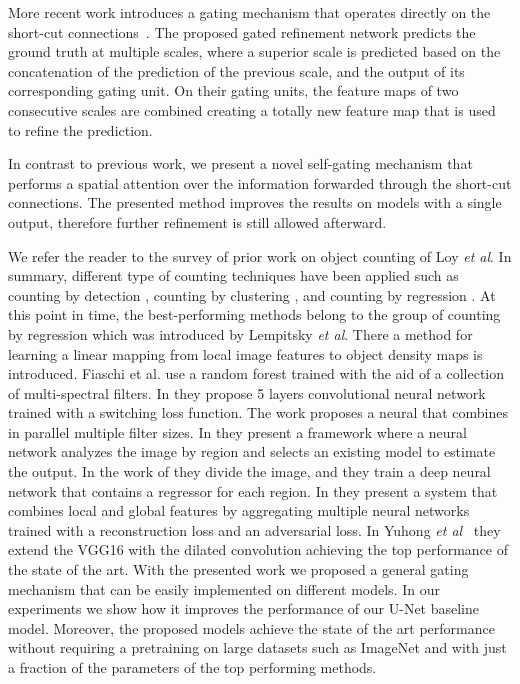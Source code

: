 \documentclass{bmvc2k}
\def\etal{\emph{et al}\bmvaOneDot}
\begin{document}
More recent work introduces a gating mechanism that operates directly on the short-cut connections~\cite{Islam_2017_CVPR}. The proposed gated refinement network predicts the ground truth at multiple scales, where a superior scale is predicted based on the concatenation of the prediction of the previous scale, and the output of its corresponding gating unit. On their gating units, the feature maps of two consecutive scales are combined creating a totally new feature map that is used to refine the prediction. 

In contrast to previous work, we present a novel self-gating mechanism that performs a spatial attention over the information forwarded through the short-cut connections. The presented method improves the results on models with a single output, therefore further refinement is still allowed afterward.


We refer the reader to the survey of prior work on object counting of Loy \etal\cite{loy2013}. In summary, different type of counting techniques have been applied such as counting by detection \cite{dalal2005,felzenszwalb2010,chen2015,leibe2005,li2008,patzold2010,viola2004,wang2011}, counting by clustering \cite{babaud2006,tu2008}, and counting by regression \cite{arteta2014,chan2008,fiaschi2012,lempitsky2010,zhang_2015_CVPR,rodriguez2011,pham2015}. At this point in time, the best-performing methods belong to the group of counting by regression which was introduced by Lempitsky \etal\cite{lempitsky2010}. There a method for learning a linear mapping from local image features to object density maps is introduced. Fiaschi et al. \cite{fiaschi2012} use a random forest trained with the aid of a collection of multi-spectral filters. In \cite{zhang_2015_CVPR} they propose 5 layers convolutional neural network trained with a switching loss function. The work \cite{zhang2016} proposes a neural that combines in parallel multiple filter sizes. In \cite{Sam_2017_CVPR} they present a framework where a neural network analyzes the image by region and selects an existing model to estimate the output. In the work of \cite{Zhang_2017_CVPR} they divide the image, and they train a deep neural network that contains a regressor for each region.  In \cite{Sindagi_2017_ICCV} they present a system that combines local and global features by aggregating multiple neural networks trained with a reconstruction loss and an adversarial loss. In Yuhong \etal~\cite{yuhong2018_csrnet} they extend the VGG16 with the dilated convolution \citep{YuKoltun2016} achieving the top performance of the state of the art. With the presented work we proposed a general gating mechanism that can be easily implemented on different models. In our experiments we show how it improves the performance of our U-Net baseline model. Moreover, the proposed models achieve the state of the art performance without requiring a pretraining on large datasets such as ImageNet and with just a fraction of the parameters of the top performing methods.
\end{document}
